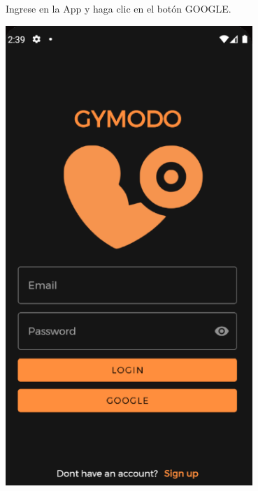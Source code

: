 \documentclass[12pt,a4paper]{article}
\begin{document}
\begin{enumerate}
\begin{minipage}{.60\textwidth}
  \item Ingrese en la App y haga clic en el botón GOOGLE.
\end{minipage}
\begin{minipage}{.40\textwidth}
  \includegraphics[width=0.7\textwidth, right]{loginpage}
\end{minipage}


\end{enumerate}
\end{document}
